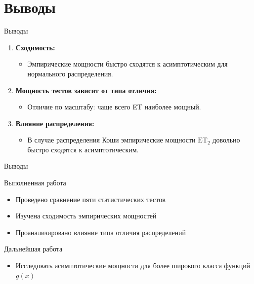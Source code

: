\documentclass[12pt]{beamer}
\begin{document}
\section{Выводы}

\begin{frame}{Выводы}
    \begin{enumerate}
        \item \textbf{Сходимость:}
        \begin{itemize}
        \item
        Эмпирические мощности быстро сходятся к асимптотическим для нормального распределения.
    	\end{itemize}
		\pause
        \item \textbf{Мощность тестов зависит от типа отличия:}
        \begin{itemize}
            \item Отличие по масштабу: чаще всего ET наиболее мощный.
        \end{itemize}
        \pause
        \item \textbf{Влияние распределения:}
        \begin{itemize}
            \item В случае распределения Коши эмпирические мощности $\text{ET}_2$ довольно быстро сходятся к асимптотическим.
        \end{itemize}
    \end{enumerate}
\end{frame}

\begin{frame}{Выводы}
    \begin{block}{Выполненная работа}
        \begin{itemize}
            \item Проведено сравнение пяти статистических тестов
            \item Изучена сходимость эмпирических мощностей
            \item Проанализировано влияние типа отличия распределений
        \end{itemize}
    \end{block}
    \pause
    \begin{block}{Дальнейшая работа}
        \begin{itemize}
            \item Исследовать асимптотические мощности для более широкого класса функций $g(x)$
        \end{itemize}
    \end{block}
\end{frame}
\end{document}
